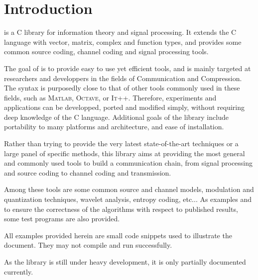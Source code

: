\chapter{Introduction}

      \libit is a C library for information theory and signal processing.
      It extends the C language with vector, matrix, complex and function
      types, and provides some common source coding, channel coding and 
      signal processing tools.

      The goal of \libit is to provide easy to use yet efficient tools,
      and is mainly targeted at researchers and developpers in the
      fields of Communication and Compression. The syntax is
      purposedly close to that of other tools commonly used in these
      fields, such as \textsc{Matlab}, \textsc{Octave}, or
      \textsc{It++}. Therefore, experiments and applications can be developped,
      ported and modified simply, without requiring deep knowledge of
      the C language. Additional goals of the library include
      portability to many platforms and architecture, and ease of
      installation.

      Rather than trying to provide the very latest state-of-the-art techniques
      or a large panel of specific methods, this library aims at providing the
      most general and commonly used tools to build a communication chain,
      from signal processing and source coding to channel coding and
      transmission.

      Among these tools are some common source and channel models, modulation
      and quantization techniques, wavelet analysis, entropy coding, etc...
      As examples and to ensure the correctness of the algorithms with respect
      to published results, some test programs are also provided.

      All examples provided herein are small code snippets used to
      illustrate the document. They may not compile and run
      successfully.

      As the library is still under heavy development, it is only
      partially documented currently.
